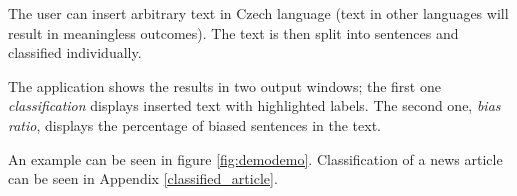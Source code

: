 The user can insert arbitrary text in Czech language (text in other languages will result in meaningless outcomes). The text is then split into sentences and classified individually.

The application shows the results in two output windows; the first one \textit{classification} displays inserted text with highlighted labels. The second one, \textit{bias ratio}, displays the percentage of biased sentences in the text.

An example can be seen in figure \ref{fig:demodemo}. 
Classification of a news article can be seen in Appendix \ref{classified_article}.

\begin{figure}
\end{figure}



